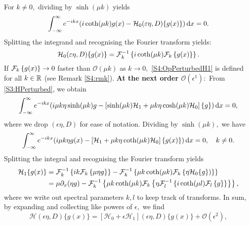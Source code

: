 For $k \neq 0,$ dividing by $\sinh(\mu k)$ yields 
\begin{equation*}
\int_{-\infty}^{\infty} e^{-ikx}( i  \coth(\mu k) g(x) - \mathcal{H}_0( \epsilon \eta, D)\{ g(x) \}) \D x = 0.
\end{equation*}
Splitting the integrand and recognising the Fourier transform yields:
\begin{equation}\label{S4:OpPerturbedH1}
\mathcal{H}_0( \epsilon \eta, D)\{ g(x) \} =\invFT{i \coth(\mu k) \FT{g(x)}}.
\end{equation}
If $\FT{ g(x)} \to 0$ faster than $\mathcal{O}(\mu k)$ as $k \to 0,$ \eqref{S4:OpPerturbedH1} is defined for all $k \in \RR$ (see Remark \ref{S4:rmk}).
\newline \textbf{At the next order $\mathcal{O}(\epsilon^1):$} From \eqref{S3:HPerturbed}, we obtain
\begin{align*}
\int_{-\infty}^{\infty} e^{-ikx}( i \mu k \eta \sinh(\mu k) g - \left[ \sinh(\mu k)\mathcal{H}_1 + \mu k \eta \cosh(\mu k) \mathcal{H}_0 \right]\{ g \}) \D x = 0,
\end{align*}
where we drop $( \epsilon \eta, D)$ for ease of notation. Dividing by $\sinh(\mu k),$ we have
\begin{align*}
\int_{-\infty}^{\infty} e^{-ikx}( i \mu k \eta g(x) - \left[\mathcal{H}_1 + \mu k \eta \coth(\mu k) \mathcal{H}_0 \right]\{ g(x) \}) \D x = 0, \quad k \neq 0.
\end{align*}
Splitting the integral and recognising the Fourier transform yields
\begin{align}
\mathcal{H}_1 \{ g(x) \} &= \invFT{ i k \FT{ \mu \eta g }}- \invFT{ \mu k \coth(\mu k) \FT{ \eta \mathcal{H}_0 \{ g \}) } } \nonumber\\
&= \mu \partial_x(\eta g) - \invFT{ \mu k \coth(\mu k) \FT{ \eta \invFT[l]{i \coth(\mu l) \FT[l]{g} } } }, \label{S4:OpPerturbedH2}
\end{align}
where we write out spectral parameters $k, l$ to keep track of transforms. In sum, by expanding and collecting like powers of $\epsilon,$ we find
\[ \mathcal{H}( \epsilon \eta, D)\{ g(x) \} = [ \mathcal{H}_0 + \epsilon \mathcal{H}_1]( \epsilon \eta, D)\{ g(x) \} + \mathcal{O}(\epsilon^2),\]
